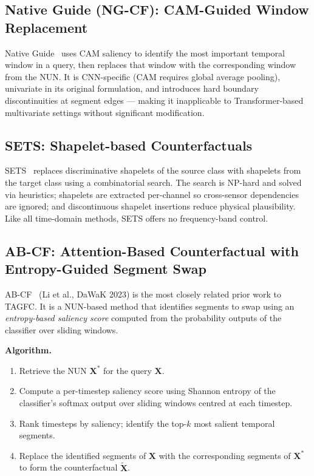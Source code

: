 \subsection{Native Guide (NG-CF): CAM-Guided Window Replacement}

Native Guide~\cite{delaney2021instance} uses CAM saliency to identify the most important temporal window in a query, then replaces that window with the corresponding window from the NUN. It is CNN-specific (CAM requires global average pooling), univariate in its original formulation, and introduces hard boundary discontinuities at segment edges — making it inapplicable to Transformer-based multivariate settings without significant modification.

\subsection{SETS: Shapelet-based Counterfactuals}

SETS~\cite{bahri2022sets} replaces discriminative shapelets of the source class with shapelets from the target class using a combinatorial search. The search is NP-hard and solved via heuristics; shapelets are extracted per-channel so cross-sensor dependencies are ignored; and discontinuous shapelet insertions reduce physical plausibility. Like all time-domain methods, SETS offers no frequency-band control.

\subsection{AB-CF: Attention-Based Counterfactual with Entropy-Guided Segment Swap}

AB-CF~\cite{li2023abcf} (Li et al., DaWaK 2023) is the most closely related prior work to TAGFC. It is a NUN-based method that identifies segments to swap using an \emph{entropy-based saliency score} computed from the probability outputs of the classifier over sliding windows.

\textbf{Algorithm.}
\begin{enumerate}
    \item Retrieve the NUN $\mathbf{X}^*$ for the query $\mathbf{X}$.
    \item Compute a per-timestep saliency score using Shannon entropy of the classifier's softmax output over sliding windows centred at each timestep.
    \item Rank timesteps by saliency; identify the top-$k$ most salient temporal segments.
    \item Replace the identified segments of $\mathbf{X}$ with the corresponding segments of $\mathbf{X}^*$ to form the counterfactual $\widetilde{\mathbf{X}}$.
\end{enumerate}


